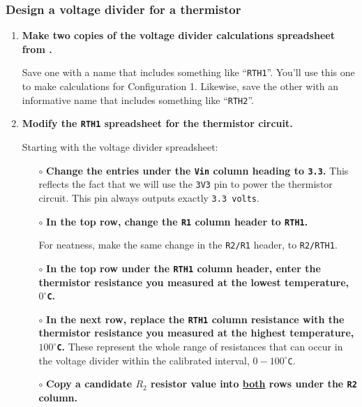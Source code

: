 \subsubsection{\howto Design a voltage divider for a thermistor}
\begin{enumerate}
	\item \textbf{Make two copies of the voltage divider calculations spreadsheet from .}
	
	Save one with a name that includes something like ``\texttt{RTH1}''. You'll use this one to make calculations for Configuration 1.
	Likewise, save the other with an informative name that includes something like ``\texttt{RTH2}''. 
	
	\item \textbf{Modify the \texttt{RTH1} spreadsheet for the thermistor circuit.}
	
	Starting with the voltage divider spreadsheet:
	\begin{itemize}
		\item[$\circ$] \textbf{Change the entries under the \texttt{Vin} column heading to \texttt{3.3}.} 
		This reflects the fact that we will use the \texttt{3V3} pin to power the thermistor circuit. This pin always outputs exactly \texttt{3.3 volts}.
		
%		 
		\item[$\circ$] \textbf{In the top row, change the \texttt{R1} column header to \texttt{RTH1}.}
				 
		For neatness, make the same change in the \texttt{R2/R1} header, to \texttt{R2/RTH1}.
		\item[$\circ$] \textbf{In the top row under the \texttt{RTH1} column header, enter the thermistor resistance you measured at the lowest temperature, $0^\circ$\texttt{C}.} 
		\item[$\circ$] \textbf{In the next row, replace the \texttt{RTH1} column resistance with the thermistor resistance you measured at the highest temperature, $100^\circ$\texttt{C}.} 
		These represent the whole range of resistances that can occur in the voltage divider within the calibrated interval, $0-100^\circ$\texttt{C}. 

		\item[$\circ$] \textbf{Copy a candidate $R_2$ resistor value into \underline{both} rows under the \texttt{R2} column.}
		

\end{itemize}
\end{enumerate}

